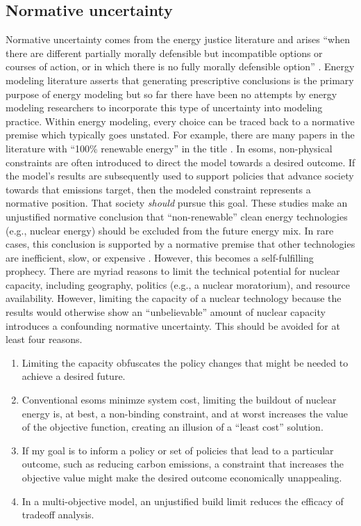\subsection{Normative uncertainty}
Normative uncertainty comes from the energy justice literature and arises ``when
there are different partially morally defensible but incompatible options or
courses of action, or in which there is no fully morally defensible option''
\cite{taebi_governing_2020}. Energy modeling literature asserts that generating
prescriptive conclusions is the primary purpose of energy modeling
\cite{decarolis_using_2011} but so far there have been no attempts by energy
modeling researchers to incorporate this type of uncertainty into modeling
practice. Within energy modeling, every choice can be traced back to a normative
premise which typically goes unstated. For example, there are many papers in the
literature with ``100\% renewable energy'' in the title
\cite{yue_least_2020,wallsgrove_emerging_2021,traber_economically_2021,
jacobson_100_2015,esteban_100_2018,dorotic_integration_2019,cosic_100_2012,
cochran_la100_2021,bussar_optimal_2014,bogdanov_full_2021}. In \acp{esom},
non-physical constraints are often introduced to direct the model towards a
desired outcome. If the model's results are subsequently used to support
policies that advance society towards that emissions target, then the modeled
constraint represents a normative position. That society \textit{should} pursue
this goal. These studies make an unjustified normative conclusion that
``non-renewable'' clean energy technologies (e.g., nuclear energy) should be
excluded from the future energy mix. In rare cases, this conclusion is supported
by a normative premise that other technologies are inefficient, slow, or
expensive \cite{traber_economically_2021}. However, this becomes a
self-fulfilling prophecy. There are myriad reasons to limit the technical
potential for nuclear capacity, including geography, politics (e.g., a nuclear
moratorium), and resource availability. However, limiting the capacity of a
nuclear technology because the results would otherwise show an ``unbelievable''
amount of nuclear capacity introduces a confounding normative uncertainty. This
should be avoided for at least four reasons.
\begin{enumerate}
    \item Limiting the capacity obfuscates the policy changes that might be
    needed to achieve a desired future.
    \item Conventional \acp{esom} minimze system cost, limiting the buildout of
    nuclear energy is, at best, a non-binding constraint, and at worst increases
    the value of the objective function, creating an illusion of a ``least
    cost'' solution.
    \item If my goal is to inform a policy or set of policies that lead to a
    particular outcome, such as reducing carbon emissions, a constraint that
    increases the objective value might make the desired outcome economically
    unappealing. 
    \item In a multi-objective model, an unjustified build limit reduces the
    efficacy of tradeoff analysis.
\end{enumerate}

